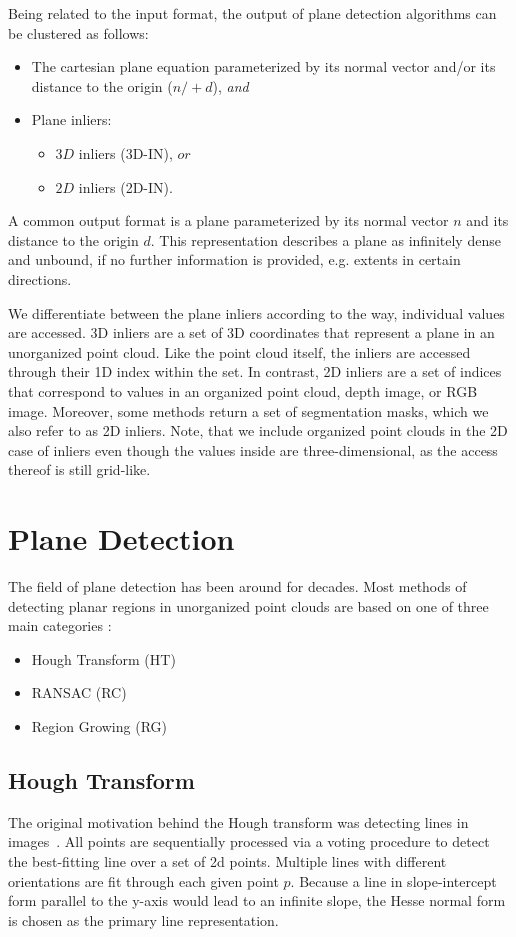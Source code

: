 \documentclass[main.tex]{subfiles}
\begin{document}
Being related to the input format, the output of plane detection algorithms can be clustered as follows:
\begin{itemize}
    \item The cartesian plane equation parameterized by its normal vector and/or its distance to the origin ($n/+d$), \textit{and}
    \item Plane inliers:
          \begin{itemize}
              \item $3D$ inliers (3D-IN), $or$
              \item $2D$ inliers (2D-IN).
          \end{itemize}
\end{itemize}

A common output format is a plane parameterized by its normal vector $n$ and its distance to the origin $d$. This representation
describes a plane as infinitely dense and unbound, if no further information is provided, e.g. extents in certain directions.

We differentiate between the plane inliers according to the way, individual values are accessed.
3D inliers are a set of 3D coordinates that represent a plane in an unorganized point cloud. Like the point cloud itself,
the inliers are accessed through their 1D index within the set.
In contrast, 2D inliers are a set of indices that correspond to values in an organized point cloud, depth image, or RGB image.
Moreover, some methods return a set of segmentation masks, which we also refer to as 2D inliers.
Note, that we include organized point clouds in the 2D case of inliers even though the values inside are three-dimensional,
as the access thereof is still grid-like.

\section{Plane Detection}
The field of plane detection has been around for decades.
Most methods of detecting planar regions in unorganized point clouds are based on one of three main categories \cite{LimbergerOliveira2015HT3D, Araújo_Oliveira_2020}:
\begin{itemize}
    \item Hough Transform (HT)
    \item RANSAC (RC)
    \item Region Growing (RG)
\end{itemize}

\subsection{Hough Transform}
The original motivation behind the Hough transform was detecting lines in images~\cite{5230799}. All points are sequentially processed via a voting procedure to detect the best-fitting line over a set of 2d points.
Multiple lines with different orientations are fit through each given point $p$.
Because a line in slope-intercept form parallel to the y-axis would lead to an infinite slope, the Hesse normal form is chosen as the primary line representation\cite{10.1145/361237.361242}.
\end{document}
